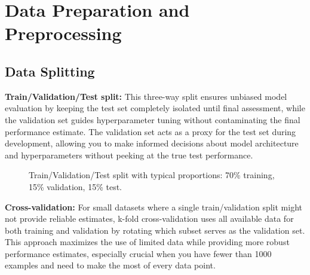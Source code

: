 
\section{Data Preparation and Preprocessing }
\label{sec:data-preparation}

\subsection{Data Splitting}

\textbf{Train/Validation/Test split:} This three-way split ensures unbiased model evaluation by keeping the test set completely isolated until final assessment, while the validation set guides hyperparameter tuning without contaminating the final performance estimate. The validation set acts as a proxy for the test set during development, allowing you to make informed decisions about model architecture and hyperparameters without peeking at the true test performance.

\begin{figure}[h]
  \centering
  \caption{Train/Validation/Test split with typical proportions: 70\% training, 15\% validation, 15\% test.}
  \label{fig:data-split}
\end{figure}

\textbf{Cross-validation:} For small datasets where a single train/validation split might not provide reliable estimates, k-fold cross-validation uses all available data for both training and validation by rotating which subset serves as the validation set. This approach maximizes the use of limited data while providing more robust performance estimates, especially crucial when you have fewer than 1000 examples and need to make the most of every data point.

